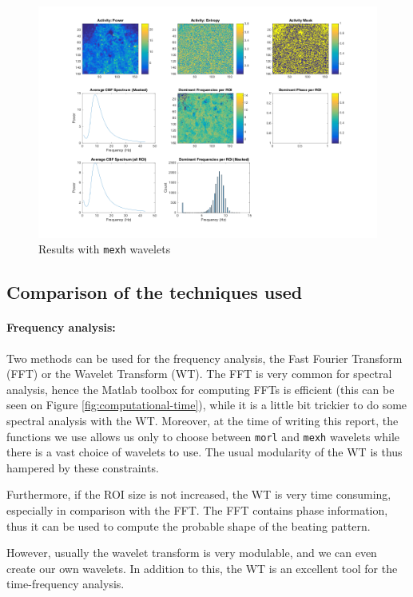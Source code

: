 \documentclass[11pt]{scrartcl}
\begin{document}
\begin{figure}[h]
  \centering
  \includegraphics[scale=0.5]{Cylia_beating_movie_mexh_mat_Results.png}
  \caption{Results with \texttt{mexh} wavelets}
  \label{fig:mexh}
\end{figure}

\subsection{Comparison of the techniques used}
\label{sec:comp-techn-used}

\paragraph{Frequency analysis:}

Two methods can be used for the frequency analysis, the Fast Fourier Transform (FFT) or the Wavelet Transform
(WT). The FFT is very common for spectral analysis, hence the Matlab toolbox for computing FFTs is efficient
(this can be seen on Figure \ref{fig:computational-time}), while it is a little bit trickier to do some
spectral analysis with the WT. Moreover, at the time of writing this report, the functions we use allows us
only to choose between \texttt{morl} and \texttt{mexh} wavelets while there is a vast choice of wavelets to
use. The usual modularity of the WT is thus hampered by these constraints. 

Furthermore, if the ROI size is not increased, the WT is very time consuming, especially in comparison with the
FFT. The FFT contains phase information, thus it can be used to compute the probable shape of the beating
pattern.

However, usually the wavelet transform is very modulable, and we can even create our own wavelets. In addition
to this, the WT is an excellent tool for the time-frequency analysis. 
\end{document}
